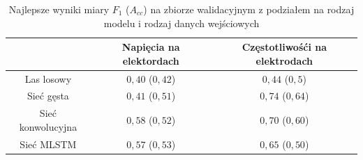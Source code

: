 \documentclass{./assets/wfis}
\begin{document}
\begin{table}[h]
    \centering
    \begin{tabular}{|c|c|c|}
        \hline
                 & Napięcia na elektordach & Częstotliwośći na elektrodach  \\
        \hline
        Las losowy & $0,40$ ($0,42$) & $0,44$ ($0,5$) \\
        Sieć gęsta  &$0,41$ ($0,51$)  & $0,74$ ($0,64$) \\
        Sieć konwolucyjna & $0,58$ ($0,52$) & $0,70$ ($0,60$) \\
        Sieć MLSTM & $0,57$ ($0,53$) & $0,65$ ($0,50$) \\
        \hline
    \end{tabular}
    \caption{Najlepsze wyniki miary $F_1$ ($A_{cc}$) na zbiorze walidacyjnym z podziałem na rodzaj modelu i rodzaj danych wejściowych}
    \label{tab:high-level-results}
\end{table}
\end{document}
